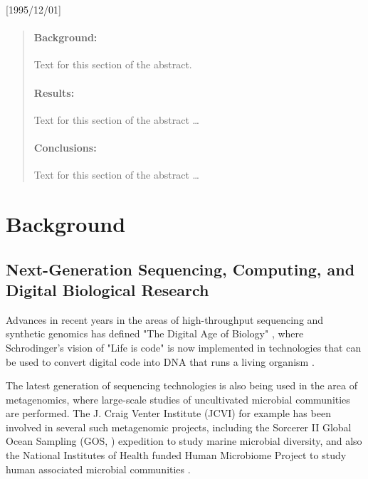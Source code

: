 \NeedsTeXFormat{LaTeX2e}[1995/12/01] \documentclass[10pt]{bmc_article}
\newenvironment{bmcformat}{\begin{raggedright}\baselineskip20pt\sloppy\setboolean{publ}{false}}{\end{raggedright}\baselineskip20pt\sloppy}
\begin{document}
\begin{bmcformat}
\begin{abstract}
\paragraph*{Background:} Text for this section of the abstract. 

\paragraph*{Results:} Text for this section of the abstract \ldots

\paragraph*{Conclusions:} Text for this section of the abstract \ldots \end{abstract}




\section*{Background}
\subsection*{Next-Generation Sequencing, Computing, and Digital Biological Research} 

Advances in recent years in the areas of high-throughput sequencing and synthetic genomics has defined "The 
Digital Age of Biology" \cite{venterdublin}, where Schrodinger's vision of "Life is code" \cite{Schrodinger1992} is 
now implemented in technologies that can be used to convert digital code into DNA that runs a living organism 
\cite{Gibson2010}. \pb

The latest generation of sequencing technologies is also being used in the area of metagenomics, where large-scale
studies of uncultivated microbial communities are performed. The J.  Craig Venter Institute (JCVI) for example has been
involved in several such metagenomic projects, including the Sorcerer II Global Ocean Sampling (GOS,
\cite{Rusch2007}) expedition to study marine microbial diversity, and also the National Institutes of Health
funded Human Microbiome Project to study human associated microbial communities \cite{Nelson2010}. \pb


\end{bmcformat}
\end{document}
